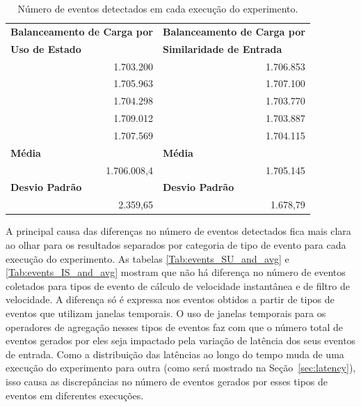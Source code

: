 \begin{table}[h!]
\centering
\caption{Número de eventos detectados em cada execução do experimento.}
\begin{tabular}{rr}
\multicolumn{1}{l}{\textbf{Balanceamento de Carga por}} & \multicolumn{1}{l}{\textbf{Balanceamento de Carga por}}  \\
\multicolumn{1}{l}{\textbf{Uso de Estado}} & \multicolumn{1}{l}{\textbf{Similaridade de Entrada}}  \\
     1.703.200   &    1.706.853     \\
           1.705.963    & 1.707.100 \\
       1.704.298    &   1.703.770   \\
        1.709.012    &  1.703.887  \\
            1.707.569  &  1.704.115 \\
\multicolumn{1}{l}{\textbf{Média}}& \multicolumn{1}{l}{\textbf{Média}}\\
       1.706.008,4   &  1.705.145  \\
\multicolumn{1}{l}{\textbf{Desvio Padrão}}& \multicolumn{1}{l}{\textbf{Desvio Padrão}} \\
 2.359,65   &  1.678,79 
\end{tabular}
\label{Tab:events_total_and_avg}
\end{table}

A principal causa das diferenças no número de eventos detectados fica mais clara ao olhar para os resultados separados por categoria de tipo de evento para cada execução do experimento. As tabelas \ref{Tab:events_SU_and_avg} e \ref{Tab:events_IS_and_avg} mostram que não há diferença no número de eventos coletados para tipos de evento de cálculo de velocidade instantânea e de filtro de velocidade. A diferença só é expressa nos eventos obtidos a partir de tipos de eventos que utilizam janelas temporais. O uso de janelas temporais para os operadores de agregação nesses tipos de eventos faz com que o número total de eventos gerados por eles seja impactado pela variação de latência dos seus eventos de entrada. Como a distribuição das latências ao longo do tempo muda de uma execução do experimento para outra (como será mostrado na Seção~\ref{sec:latency}), isso causa as discrepâncias no número de eventos gerados por esses tipos de eventos em diferentes execuções.





